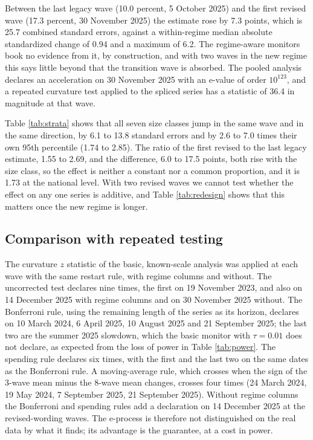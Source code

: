 \documentclass[Afour,sageh,times]{sagej}
\theoremstyle{definition}
\begin{document}
Between the last legacy wave (10.0 percent, 5 October 2025) and the first revised wave (17.3 percent, 30 November 2025) the estimate rose by 7.3 points, which is 25.7 combined standard errors, against a within-regime median absolute standardized change of 0.94 and a maximum of 6.2. The regime-aware monitors book no evidence from it, by construction, and with two waves in the new regime this says little beyond that the transition wave is absorbed. The pooled analysis declares an acceleration on 30 November 2025 with an e-value of order $10^{123}$, and a repeated curvature test applied to the spliced series has a statistic of 36.4 in magnitude at that wave.

Table \ref{tab:strata} shows that all seven size classes jump in the same wave and in the same direction, by 6.1 to 13.8 standard errors and by 2.6 to 7.0 times their own 95th percentile (1.74 to 2.85). The ratio of the first revised to the last legacy estimate, 1.55 to 2.69, and the difference, 6.0 to 17.5 points, both rise with the size class, so the effect is neither a constant nor a common proportion, and it is 1.73 at the national level. With two revised waves we cannot test whether the effect on any one series is additive, and Table \ref{tab:redesign} shows that this matters once the new regime is longer.

\subsection{Comparison with repeated testing}
\label{sec:comparison}

The curvature $z$ statistic of the basic, known-scale analysis was applied at each wave with the same restart rule, with regime columns and without. The uncorrected test declares nine times, the first on 19 November 2023, and also on 14 December 2025 with regime columns and on 30 November 2025 without. The Bonferroni rule, using the remaining length of the series as its horizon, declares on 10 March 2024, 6 April 2025, 10 August 2025 and 21 September 2025; the last two are the summer 2025 slowdown, which the basic monitor with $\tau = 0.01$ does not declare, as expected from the loss of power in Table \ref{tab:power}. The spending rule declares six times, with the first and the last two on the same dates as the Bonferroni rule. A moving-average rule, which crosses when the sign of the 3-wave mean minus the 8-wave mean changes, crosses four times (24 March 2024, 19 May 2024, 7 September 2025, 21 September 2025). Without regime columns the Bonferroni and spending rules add a declaration on 14 December 2025 at the revised-wording waves. The e-process is therefore not distinguished on the real data by what it finds; its advantage is the guarantee, at a cost in power.
\end{document}
